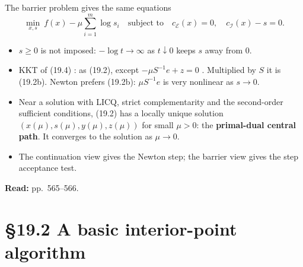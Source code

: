 \documentclass[aspectratio=169,12pt]{beamer}
\newcommand{\eqn}[1]{\text{\small(#1)}}
\newcommand{\readbook}[1]{{\color{red}\textbf{Read:} #1}}
\newcommand{\cE}{\mathcal{E}}
\newcommand{\cI}{\mathcal{I}}
\begin{document}
\begin{frame}{The barrier problem gives the same equations}
  \[ \min_{x,s}\ f(x)-\mu\sum_{i=1}^{m}\log s_{i}\quad\text{subject to}\quad
     c_{\cE}(x)=0,\quad c_{\cI}(x)-s=0 . \tag{19.4} \]
  \begin{itemize}\setlength\itemsep{0.1em}
    \item $s\ge 0$ is not imposed: $-\log t\to\infty$ as $t\downarrow 0$ keeps $s$ away from $0$.
    \item KKT of (19.4) \eqn{19.5}: as (19.2), except $-\mu S^{-1}e+z=0$ \eqn{19.5b}.
      Multiplied by $S$ it is (19.2b). Newton prefers (19.2b): $\mu S^{-1}e$ is very nonlinear as $s\to 0$.
    \item Near a solution with LICQ, strict complementarity and the second-order sufficient conditions,
      (19.2) has a locally unique solution $(x(\mu),s(\mu),y(\mu),z(\mu))$ for small $\mu>0$: the
      \textbf{primal-dual central path}. It converges to the solution as $\mu\to 0$.
    \item The continuation view gives the Newton step; the barrier view gives the step acceptance test.
  \end{itemize}
  \readbook{pp.~565--566.}
\end{frame}

\section{\S19.2 A basic interior-point algorithm}
\end{document}
